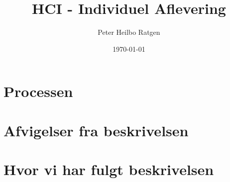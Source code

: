 \documentclass{article}
\title{HCI - Individuel Aflevering}
\author{Peter Heilbo Ratgen}
\date{\today}
\begin{document}
\maketitle
\section{Processen}

\section{Afvigelser fra beskrivelsen}

\section{Hvor vi har fulgt beskrivelsen}
\end{document}
